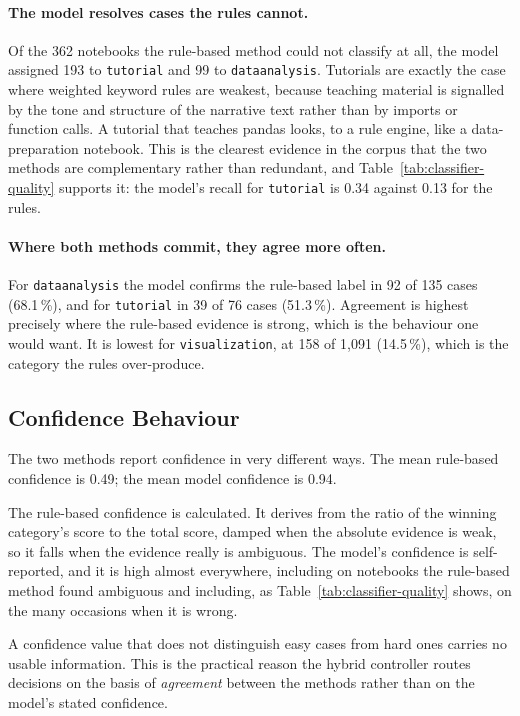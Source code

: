 \paragraph{The model resolves cases the rules cannot.} Of the 362 notebooks the rule-based method could not classify at all, the model assigned 193 to \texttt{tutorial} and 99 to \texttt{data\ub analysis}. Tutorials are exactly the case where weighted keyword rules are weakest, because teaching material is signalled by the tone and structure of the narrative text rather than by imports or function calls. A tutorial that teaches pandas looks, to a rule engine, like a data-preparation notebook. This is the clearest evidence in the corpus that the two methods are complementary rather than redundant, and Table~\ref{tab:classifier-quality} supports it: the model's recall for \texttt{tutorial} is 0.34 against 0.13 for the rules.

\paragraph{Where both methods commit, they agree more often.} For \texttt{data\ub analysis} the model confirms the rule-based label in 92 of 135 cases (68.1\,\%), and for \texttt{tutorial} in 39 of 76 cases (51.3\,\%). Agreement is highest precisely where the rule-based evidence is strong, which is the behaviour one would want. It is lowest for \texttt{visualization}, at 158 of 1{,}091 (14.5\,\%), which is the category the rules over-produce.

\subsection{Confidence Behaviour}

The two methods report confidence in very different ways. The mean rule-based confidence is 0.49; the mean model confidence is 0.94.

The rule-based confidence is calculated. It derives from the ratio of the winning category's score to the total score, damped when the absolute evidence is weak, so it falls when the evidence really is ambiguous. The model's confidence is self-reported, and it is high almost everywhere, including on notebooks the rule-based method found ambiguous and including, as Table~\ref{tab:classifier-quality} shows, on the many occasions when it is wrong.

A confidence value that does not distinguish easy cases from hard ones carries no usable information. This is the practical reason the hybrid controller routes decisions on the basis of \emph{agreement} between the methods rather than on the model's stated confidence.


